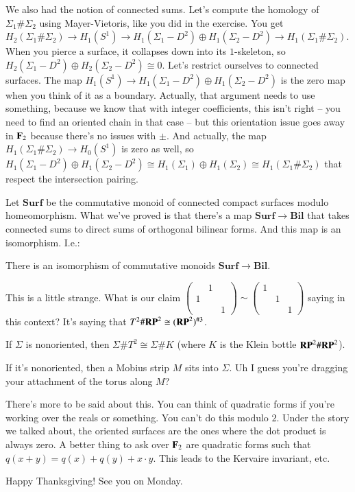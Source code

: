 We also had the notion of connected sums. Let's compute the homology of $\Sigma_1\#\Sigma_2$ using Mayer-Vietoris, like you did in the exercise. You get $ H_2(\Sigma_1\#\Sigma_2)\to H_1(S^1)\to H_1(\Sigma_1-D^2)\oplus H_1(\Sigma_2-D^2)\to H_1(\Sigma_1\#\Sigma_2)$. When you pierce a surface, it collapses down into its $1$-skeleton, so $ H_2(\Sigma_1-D^2)\oplus H_2(\Sigma_2-D^2)\cong 0$. Let's restrict ourselves to connected surfaces. The map $ H_1(S^1)\to H_1(\Sigma_1-D^2)\oplus H_1(\Sigma_2-D^2)$ is the zero map when you think of it as a boundary. Actually, that argument needs to use something, because we know that with integer coefficients, this isn't right -- you need to find an oriented chain in that case -- but this orientation issue goes away in $\mathbf F_2$ because there's no issues with $\pm$. And actually, the map $ H_1(\Sigma_1\#\Sigma_2)\to H_0(S^1)$ is zero as well, so $ H_1(\Sigma_1-D^2)\oplus H_1(\Sigma_2-D^2)\cong H_1(\Sigma_1)\oplus H_1(\Sigma_2)\cong H_1(\Sigma_1\#\Sigma_2)$ that respect the intersection pairing.

Let $\mathbf{Surf}$ be the commutative monoid of connected compact surfaces modulo homeomorphism. What we've proved is that there's a map $\mathbf{Surf}\to\mathbf{Bil}$ that takes connected sums to direct sums of orthogonal bilinear forms. And this map is an isomorphism. I.e.:
\begin{theorem}
There is an isomorphism of commutative monoids $\mathbf{Surf}\to\mathbf{Bil}$.
\end{theorem}
This is a little strange. What is our claim $\begin{pmatrix}
 & 1 & \\
1 & & \\
 & & 1
\end{pmatrix}
\sim
\begin{pmatrix}
1 & & \\
& 1 & \\
& & 1
\end{pmatrix}$ saying in this context? It's saying that $T^2\#\mathbf{RP}^2\cong(\mathbf{RP}^2)^{\# 3}$.
\begin{claim}
If $\Sigma$ is nonoriented, then $\Sigma\# T^2\cong\Sigma\# K$ (where $K$ is the Klein bottle $\mathbf{RP}^2\#\mathbf{RP}^2$).
\end{claim}
If it's nonoriented, then a Mobius strip $M$ sits into $\Sigma$. Uh I guess you're dragging your attachment of the torus along $M$?

There's more to be said about this. You can think of quadratic forms if you're working over the reals or something. You can't do this modulo $2$. Under the story we talked about, the oriented surfaces are the ones where the dot product is always zero. A better thing to ask over $\mathbf F_2$ are quadratic forms such that $q(x+y)=q(x)+q(y)+x\cdot y$. This leads to the Kervaire invariant, etc.

Happy Thanksgiving! See you on Monday.
